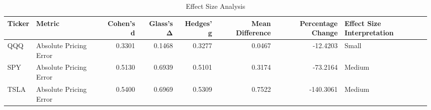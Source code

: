 \begin{table}
\caption{Effect Size Analysis}
\label{tab:effect_sizes}
\begin{tabular}{llrrrrrl}
\toprule
Ticker & Metric & Cohen's d & Glass's Δ & Hedges' g & Mean Difference & Percentage Change & Effect Size Interpretation \\
\midrule
QQQ & Absolute Pricing Error & 0.3301 & 0.1468 & 0.3277 & 0.0467 & -12.4203 & Small \\
SPY & Absolute Pricing Error & 0.5130 & 0.6939 & 0.5101 & 0.3174 & -73.2164 & Medium \\
TSLA & Absolute Pricing Error & 0.5400 & 0.6969 & 0.5309 & 0.7522 & -140.3061 & Medium \\
\bottomrule
\end{tabular}
\end{table}
